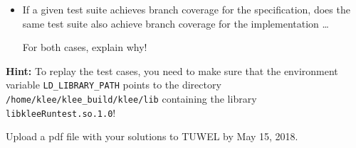 \documentclass[11pt,a4paper]{article}
\begin{document}
\clearpage
\begin{itemize}
\item If a given test suite achieves branch coverage
  for the specification, does the same test suite also
  achieve branch coverage for the implementation \ldots
  For both cases, explain why!
\end{itemize}

{\bf Hint:} To replay the test cases, you need to make sure that
the environment variable {\tt LD\_LIBRARY\_PATH} points to the
directory {\tt /home/klee/klee\_build/klee/lib} containing
the library {\tt libkleeRuntest.so.1.0}!

\vfill
Upload a pdf file with your solutions to TUWEL by May 15, 2018.
\end{document}
